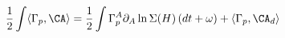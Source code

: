 \begin{equation}
 \frac{1}{2} \int \langle \Gamma_p,\CA \rangle = \frac{1}{2} \int \Gamma_p^A \partial_A \ln \Sigma(H) \, (dt+\omega) +
 \langle \Gamma_p,\CA_d \rangle
\end{equation}

